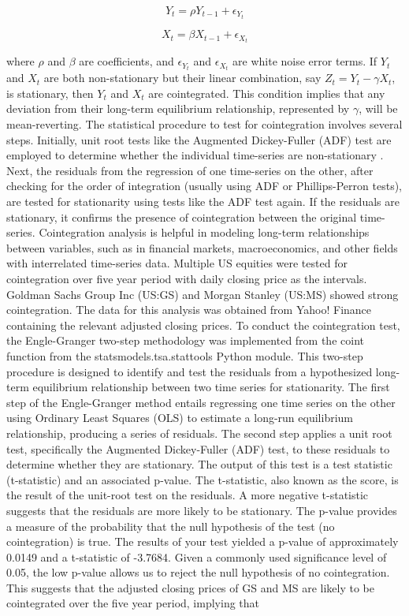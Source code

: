 \documentclass{article}
\theoremstyle{break}
\begin{document}
\begin{equation}
Y_t = \rho Y_{t-1} + \epsilon_{Y_t}
\end{equation}

\begin{equation}
X_t = \beta X_{t-1} + \epsilon_{X_t}
\end{equation}


where $\rho$ and $\beta$ are coefficients, and $\epsilon_{Y_t}$ and $\epsilon_{X_t}$ are white noise error terms. If $Y_t$ and $X_t$ are both non-stationary but their linear combination, say $Z_t=Y_t - \gamma X_t$, is stationary, then $Y_t$ and $X_t$ are cointegrated. This condition implies that any deviation from their long-term equilibrium relationship, represented by $\gamma$, will be mean-reverting. The statistical procedure to test for cointegration involves several steps. Initially, unit root tests like the Augmented Dickey-Fuller (ADF) test are employed to determine whether the individual time-series are non-stationary \cite{engle_granger, dickey_fuller}. Next, the residuals from the regression of one time-series on the other, after checking for the order of integration (usually using ADF or Phillips-Perron tests), are tested for stationarity using tests like the ADF test again. If the residuals are stationary, it confirms the presence of cointegration between the original time-series. Cointegration analysis is helpful in modeling long-term relationships between variables, such as in financial markets, macroeconomics, and other fields with interrelated time-series data. Multiple US equities were tested for cointegration over five year period with daily closing price as the intervals. Goldman Sachs Group Inc (US:GS) and Morgan Stanley (US:MS) showed strong cointegration. The data for this analysis was obtained from Yahoo! Finance containing the relevant adjusted closing prices. To conduct the cointegration test, the Engle-Granger two-step methodology was implemented from the coint function from the statsmodels.tsa.stattools Python module. This two-step procedure is designed to identify and test the residuals from a hypothesized long-term equilibrium relationship between two time series for stationarity. The first step of the Engle-Granger method entails regressing one time series on the other using Ordinary Least Squares (OLS) to estimate a long-run equilibrium relationship, producing a series of residuals. The second step applies a unit root test, specifically the Augmented Dickey-Fuller (ADF) test, to these residuals to determine whether they are stationary. The output of this test is a test statistic (t-statistic) and an associated p-value. The t-statistic, also known as the score, is the result of the unit-root test on the residuals. A more negative t-statistic suggests that the residuals are more likely to be stationary. The p-value provides a measure of the probability that the null hypothesis of the test (no cointegration) is true. The results of your test yielded a p-value of approximately 0.0149 and a t-statistic of -3.7684. Given a commonly used significance level of 0.05, the low p-value allows us to reject the null hypothesis of no cointegration. This suggests that the adjusted closing prices of GS and MS are likely to be cointegrated over the five year period, implying that 
\end{document}
